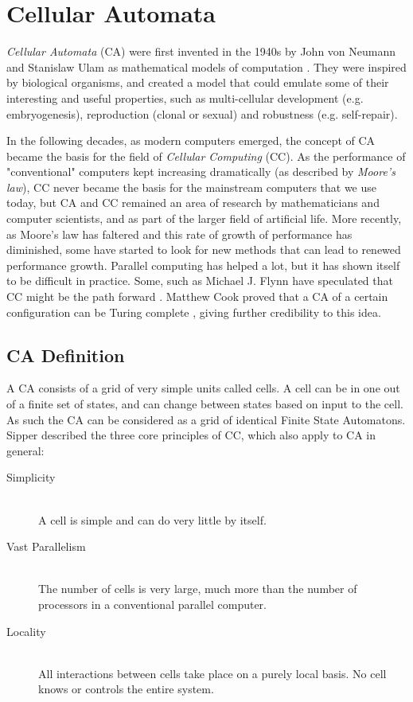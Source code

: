 \section{Cellular Automata}
\textit{Cellular Automata} (CA) were first invented in the 1940s by John von Neumann and Stanislaw Ulam as mathematical models of computation \cite{von-neumann-1966}.
They were inspired by biological organisms,
and created a model that could emulate some of their interesting and useful properties,
such as multi-cellular development (e.g. embryogenesis), reproduction (clonal or sexual) and robustness (e.g. self-repair).

In the following decades, as modern computers emerged,
the concept of CA became the basis for the field of \textit{Cellular Computing} (CC).
As the performance of "conventional" computers kept increasing dramatically (as described by \textit{Moore's law})\cite{schaller1997moore},
CC never became the basis for the mainstream computers that we use today,
but CA and CC remained an area of research by mathematicians and computer scientists,
and as part of the larger field of artificial life.
More recently, as Moore's law has faltered and this rate of growth of performance has diminished,
some have started to look for new methods that can lead to renewed performance growth.
Parallel computing has helped a lot, but it has shown itself to be difficult in practice.
Some, such as Michael J. Flynn have speculated that CC might be the path forward \cite{flynn-1996} .
Matthew Cook proved that a CA of a certain configuration can be Turing complete \cite{cook-2004},
giving further credibility to this idea.

\subsection{CA Definition}
A CA consists of a grid of very simple units called cells.
A cell can be in one out of a finite set of states, and can change between states based on input to the cell.
As such the CA can be considered as a grid of identical Finite State Automatons.
Sipper \cite{sipper-1999} described the three core principles of CC, which also apply to CA in general:

\begin{description}
    \item[Simplicity]
        ~\\
        A cell is simple and can do very little by itself.
    \item[Vast Parallelism]
        ~\\
        The number of cells is very large, much more than the number of processors in a conventional parallel computer.
    \item[Locality]
        ~\\
        All interactions between cells take place on a purely local basis.
        No cell knows or controls the entire system.
\end{description}


